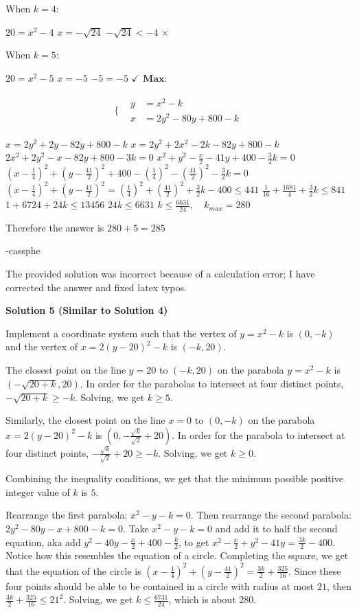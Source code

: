 \begin{enumerate}
 When $k = 4$:

 $20 = x^2-4$ $x=-\sqrt{24}$
$-\sqrt{24}<-4$ $\times$ 

 When $k = 5$:

 $20 = x^2-5$ $x=-5$
$-5 = -5$ $\checkmark$
$\textbf{Max}:$

 \begin{align*}\{ & \left.\begin{aligned}y &= x^2-k \\x &= 2y^2-80y+800-k\end{aligned} \right.\end{align*}


 
$x = 2y^2+2y-82y+800-k$
$x = 2y^2+2x^2-2k-82y+800-k$
$2x^2+2y^2-x-82y+800-3k=0$
$x^2+y^2-\frac{x}{2}-41y+400-\frac{3}{2}k = 0$
$(x-\frac{1}{4})^2+(y-\frac{41}{2})^2+400-(\frac{1}{4})^2-(\frac{41}{2})^2 - \frac{3}{2}k = 0$
$(x-\frac{1}{4})^2+(y-\frac{41}{2})^2 = (\frac{1}{4})^2+(\frac{41}{2})^2 + \frac{3}{2}k - 400 \leq 441$
$\frac{1}{16}+\frac{1681}{4}+\frac{3}{2}k \leq 841$
$1+6724+24k \leq 13456$
$24k \leq 6631$
$k \leq \frac{6631}{24}, \quad k_{max} = 280$

 Therefore the answer is $280+5 = \boxed{285}$

 -cassphe

 The provided solution was incorrect because of a calculation error; I have corrected the answer and fixed latex typos.

 



\textbf{Solution 5 (Similar to Solution 4)}

Implement a coordinate system such that the vertex of $y=x^2-k$ is $(0, -k)$ and the vertex of $x=2(y-20)^2-k$ is $(-k, 20)$.

 The closest point on the line $y=20$ to $(-k, 20)$ on the parabola $y=x^2-k$ is $(-\sqrt{20+k}, 20)$. In order for the parabolas to intersect at four distinct points, $-\sqrt{20+k}\geq-k$. Solving, we get $k\geq5$.

 Similarly, the closest point on the line $x=0$ to $(0, -k)$ on the parabola $x=2(y-20)^2-k$ is $(0, -\frac{\sqrt{k}}{\sqrt{2}}+20)$. In order for the parabola to intersect at four distinct points, $-\frac{\sqrt{k}}{\sqrt{2}}+20\geq-k$. Solving, we get $k\geq0$.

 Combining the inequality conditions, we get that the minimum possible positive integer value of $k$ is $5$.

 Rearrange the first parabola: $x^2-y-k=0$. Then rearrange the second parabola: $2y^2-80y-x+800-k=0$. Take $x^2-y-k=0$ and add it to half the second equation, aka add $y^2-40y-\frac{x}{2}+400-\frac{k}{2}$, to get $x^2-\frac{x}{2}+y^2-41y=\frac{3k}{2}-400$. Notice how this resembles the equation of a circle. Completing the square, we get that the equation of the circle is $(x-\frac{1}{4})^2+(y-\frac{41}{2})^2=\frac{3k}{2}+\frac{325}{16}$. Since these four points should be able to be contained in a circle with radius at most $21$, then $\frac{3k}{2}+\frac{325}{16}\leq21^2$. Solving, we get $k\leq\frac{6731}{24}$, which is about $280$.


\end{enumerate}
